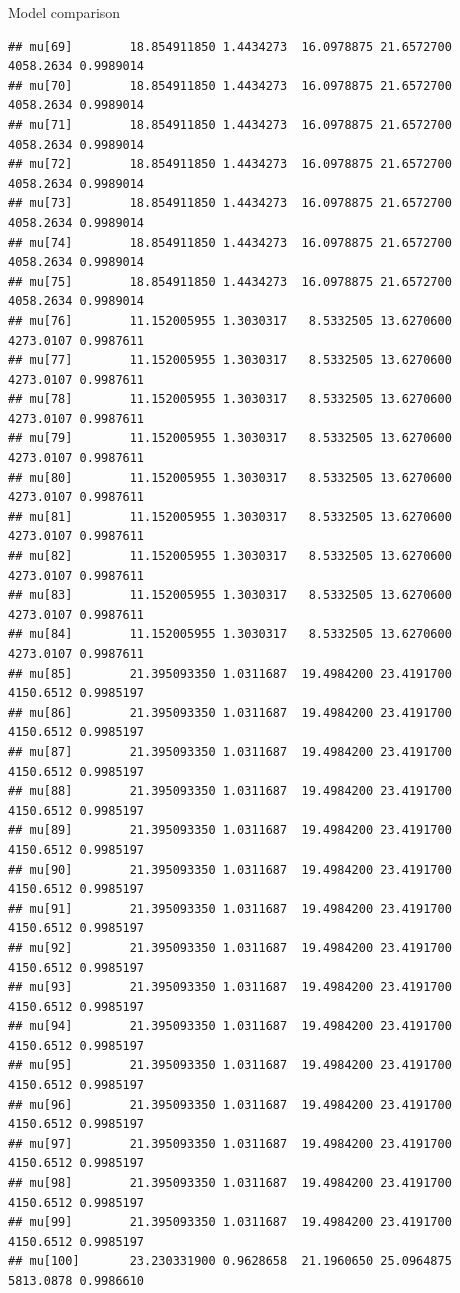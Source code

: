 \documentclass[
  ignorenonframetext,
]{beamer}
\begin{document}
\begin{frame}[fragile]{Model comparison}
\begin{verbatim}
## mu[69]        18.854911850 1.4434273  16.0978875 21.6572700 4058.2634 0.9989014
## mu[70]        18.854911850 1.4434273  16.0978875 21.6572700 4058.2634 0.9989014
## mu[71]        18.854911850 1.4434273  16.0978875 21.6572700 4058.2634 0.9989014
## mu[72]        18.854911850 1.4434273  16.0978875 21.6572700 4058.2634 0.9989014
## mu[73]        18.854911850 1.4434273  16.0978875 21.6572700 4058.2634 0.9989014
## mu[74]        18.854911850 1.4434273  16.0978875 21.6572700 4058.2634 0.9989014
## mu[75]        18.854911850 1.4434273  16.0978875 21.6572700 4058.2634 0.9989014
## mu[76]        11.152005955 1.3030317   8.5332505 13.6270600 4273.0107 0.9987611
## mu[77]        11.152005955 1.3030317   8.5332505 13.6270600 4273.0107 0.9987611
## mu[78]        11.152005955 1.3030317   8.5332505 13.6270600 4273.0107 0.9987611
## mu[79]        11.152005955 1.3030317   8.5332505 13.6270600 4273.0107 0.9987611
## mu[80]        11.152005955 1.3030317   8.5332505 13.6270600 4273.0107 0.9987611
## mu[81]        11.152005955 1.3030317   8.5332505 13.6270600 4273.0107 0.9987611
## mu[82]        11.152005955 1.3030317   8.5332505 13.6270600 4273.0107 0.9987611
## mu[83]        11.152005955 1.3030317   8.5332505 13.6270600 4273.0107 0.9987611
## mu[84]        11.152005955 1.3030317   8.5332505 13.6270600 4273.0107 0.9987611
## mu[85]        21.395093350 1.0311687  19.4984200 23.4191700 4150.6512 0.9985197
## mu[86]        21.395093350 1.0311687  19.4984200 23.4191700 4150.6512 0.9985197
## mu[87]        21.395093350 1.0311687  19.4984200 23.4191700 4150.6512 0.9985197
## mu[88]        21.395093350 1.0311687  19.4984200 23.4191700 4150.6512 0.9985197
## mu[89]        21.395093350 1.0311687  19.4984200 23.4191700 4150.6512 0.9985197
## mu[90]        21.395093350 1.0311687  19.4984200 23.4191700 4150.6512 0.9985197
## mu[91]        21.395093350 1.0311687  19.4984200 23.4191700 4150.6512 0.9985197
## mu[92]        21.395093350 1.0311687  19.4984200 23.4191700 4150.6512 0.9985197
## mu[93]        21.395093350 1.0311687  19.4984200 23.4191700 4150.6512 0.9985197
## mu[94]        21.395093350 1.0311687  19.4984200 23.4191700 4150.6512 0.9985197
## mu[95]        21.395093350 1.0311687  19.4984200 23.4191700 4150.6512 0.9985197
## mu[96]        21.395093350 1.0311687  19.4984200 23.4191700 4150.6512 0.9985197
## mu[97]        21.395093350 1.0311687  19.4984200 23.4191700 4150.6512 0.9985197
## mu[98]        21.395093350 1.0311687  19.4984200 23.4191700 4150.6512 0.9985197
## mu[99]        21.395093350 1.0311687  19.4984200 23.4191700 4150.6512 0.9985197
## mu[100]       23.230331900 0.9628658  21.1960650 25.0964875 5813.0878 0.9986610

\end{verbatim}
\end{frame}
\end{document}
